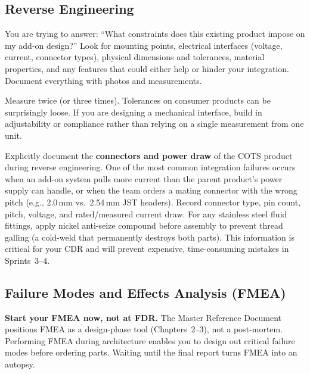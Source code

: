 \subsection{Reverse Engineering}

\begin{faqbox}
You are trying to answer: ``What constraints does this existing product impose on my add-on design?'' Look for mounting points, electrical interfaces (voltage, current, connector types), physical dimensions and tolerances, material properties, and any features that could either help or hinder your integration. Document everything with photos and measurements.
\end{faqbox}

\begin{protip}
Measure twice (or three times). Tolerances on consumer products can be surprisingly loose. If you are designing a mechanical interface, build in adjustability or compliance rather than relying on a single measurement from one unit.
\end{protip}

\begin{warnbox}
Explicitly document the \textbf{connectors and power draw} of the COTS product during reverse engineering. One of the most common integration failures occurs when an add-on system pulls more current than the parent product's power supply can handle, or when the team orders a mating connector with the wrong pitch (e.g., 2.0\,mm vs.\ 2.54\,mm JST headers). Record connector type, pin count, pitch, voltage, and rated/measured current draw. For any stainless steel fluid fittings, apply nickel anti-seize compound before assembly to prevent thread galling (a cold-weld that permanently destroys both parts). This information is critical for your CDR and will prevent expensive, time-consuming mistakes in Sprints~3--4.
\end{warnbox}

\subsection{Failure Modes and Effects Analysis (FMEA)}

\begin{tipbox}
\textbf{Start your FMEA now, not at FDR.} The Master Reference Document positions FMEA as a design-phase tool (Chapters~2--3), not a post-mortem. Performing FMEA during architecture enables you to design out critical failure modes before ordering parts. Waiting until the final report turns FMEA into an autopsy.
\end{tipbox}

